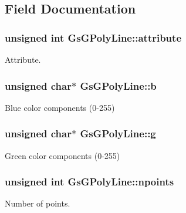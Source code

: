 \subsection{Field Documentation}
\hypertarget{structGsGPolyLine_a5f67125c2c74cc7a43aa365cdffe846a}{}
\subsubsection[{attribute}]{\setlength{\rightskip}{0pt plus 5cm}unsigned int Gs\+G\+Poly\+Line\+::attribute}\label{structGsGPolyLine_a5f67125c2c74cc7a43aa365cdffe846a}


Attribute. 

\hypertarget{structGsGPolyLine_acd61a23a904017e2d182acc9e673e101}{}
\subsubsection[{b}]{\setlength{\rightskip}{0pt plus 5cm}unsigned char$\ast$ Gs\+G\+Poly\+Line\+::b}\label{structGsGPolyLine_acd61a23a904017e2d182acc9e673e101}


Blue color components (0-\/255) 

\hypertarget{structGsGPolyLine_a897d8c35683440a8247737667f10e827}{}
\subsubsection[{g}]{\setlength{\rightskip}{0pt plus 5cm}unsigned char$\ast$ Gs\+G\+Poly\+Line\+::g}\label{structGsGPolyLine_a897d8c35683440a8247737667f10e827}


Green color components (0-\/255) 

\hypertarget{structGsGPolyLine_a2d8beceb965816f22b26cd42e3e1394d}{}
\subsubsection[{npoints}]{\setlength{\rightskip}{0pt plus 5cm}unsigned int Gs\+G\+Poly\+Line\+::npoints}\label{structGsGPolyLine_a2d8beceb965816f22b26cd42e3e1394d}


Number of points. 

